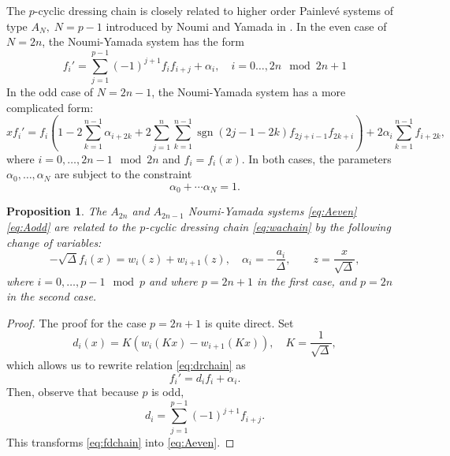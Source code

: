 \documentclass{amsart}
\newtheorem{proposition}{Proposition}
\theoremstyle{definition}
\DeclareMathOperator{\sgn}{\operatorname{sgn}}
\begin{document}
The $p$-cyclic dressing chain is closely related to higher order
Painlev\'e systems of type $A_{N},\; N=p-1$ introduced by Noumi and
Yamada in \cite{noumi1998higher}. In the even case of $N=2n$, the
Noumi-Yamada system has the form
\begin{equation}
  \label{eq:Aeven}
  f_i' = \sum_{j=1}^{p-1} (-1)^{j+1} f_i f_{i+j} +\alpha_i,\quad
  i=0\ldots, 2n \mod 2n+1
\end{equation}
In the odd case of $N=2n-1$, the Noumi-Yamada system has a more
complicated form:
\begin{equation}
  \label{eq:Aodd}
  xf_i' = f_i\left(1    - 2\sum_{k=1}^{n-1}
    \alpha_{i+2k} + 2\sum_{j=1}^{n}\sum_{k=1}^{n-1} \sgn(2j-1-2k)
    f_{2j+i-1} f_{2k+i} \right) + 2\alpha_i \sum_{k=1}^{n-1} f_{i+2k},
\end{equation}
where $i=0,\ldots, 2n-1\mod 2n$ and $f_i = f_i(x)$. In both cases, the
parameters $\alpha_0,\ldots, \alpha_{N}$ are subject to the constraint
\[ \alpha_0+ \cdots \alpha_{N} = 1.\]
\begin{proposition}
  \label{prop:wtof}
  The $A_{2n}$ and $A_{2n-1}$ Noumi-Yamada systems \eqref{eq:Aeven}
  \eqref{eq:Aodd} are related to the $p$-cyclic dressing chain
  \eqref{eq:wachain} by the following change of variables:
  \begin{equation}
    \label{eq:ffromw}
    -\sqrt{\Delta} f_i(x) =w_{i}(z) + w_{i+1}(z),\quad \alpha_i =
    -\frac{a_i}{\Delta},\qquad z=\frac{x}{\sqrt{\Delta}},
  \end{equation}
  where $i=0,\dots, p-1 \mod p$ and where $p=2n+1$ in the first case,
  and $p=2n$ in the second case.
\end{proposition}
\begin{proof}
  The proof for the case $p=2n+1$ is quite direct. Set
  \[ d_i(x) = K(w_{i}(Kx) - w_{i+1} (Kx)), \quad K =
    \frac{1}{\sqrt{\Delta}},\] which allows us to rewrite relation
  \eqref{eq:drchain} as
  \begin{equation}
    \label{eq:fdchain}
    f_i'   = d_i f_i +\alpha_i.  
  \end{equation}
  Then,  observe that because $p$ is odd,
  \begin{equation}
    \label{eq:diodd} 
    d_i=\sum_{j=1}^{p-1} (-1)^{j+1} f_{i+j}.
  \end{equation}
  This transforms \eqref{eq:fdchain} into \eqref{eq:Aeven}.
\end{proof}
\end{document}
